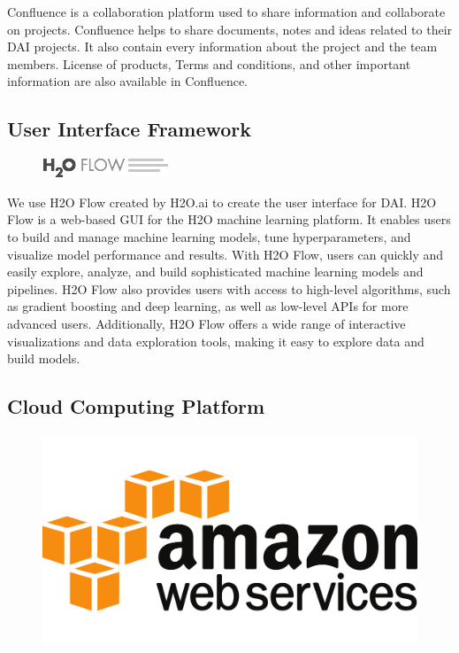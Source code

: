 \documentclass[12pt,a4paper]{report}
\begin{document}
Confluence is a collaboration platform used to share information and collaborate on projects. Confluence helps to share documents, notes and ideas related to their \ac{DAI} projects.
It also contain every information about the project and the team members. License of products, Terms and conditions, and other important information are also available in Confluence.
\\
\subsection{User Interface Framework}

\begin{figure}
\includegraphics[width=1\linewidth]{h2o-flow.png}
\end{figure}

We use H2O Flow created by H2O.ai to create the user interface for \ac{DAI}. H2O Flow is a web-based \ac{GUI} for the H2O machine learning platform. It enables users to build and manage machine learning models, tune hyperparameters, and visualize model performance and results. With H2O Flow, users can quickly and easily explore, analyze, and build sophisticated machine learning models and pipelines. H2O Flow also provides users with access to high-level algorithms, such as gradient boosting and deep learning, as well as low-level APIs for more advanced users. Additionally, H2O Flow offers a wide range of interactive visualizations and data exploration tools, making it easy to explore data and build models.

\subsection{Cloud Computing Platform}

\begin{figure}
\includegraphics[width=1\linewidth]{aws.png}
\end{figure}
\end{document}
